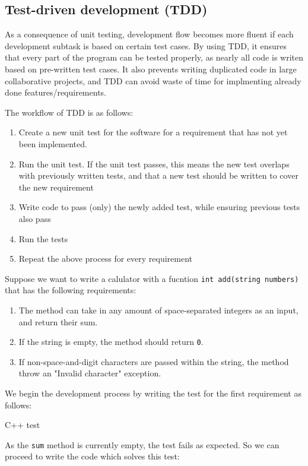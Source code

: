 \subsection{Test-driven development (TDD)}
As a consequence of unit testing, development flow becomes more fluent if each development subtask is based on certain test cases. By using TDD, it ensures that every part of the program can be tested properly, as nearly all code is writen based on pre-written test cases. It also prevents writing duplicated code in large collaborative projects, and TDD can avoid waste of time for implmenting already done features/requirements. 

The workflow of TDD is as follows:

\begin{enumerate}
	\item Create a new unit test for the software for a requirement that has not yet been implemented. 
	\item Run the unit test. If the unit test passes, this means the new test overlaps with previously written tests, and that a new test should be written to cover the new requirement
	\item Write code to pass (only) the newly added test, while ensuring previous tests also pass
	\item Run the tests
	\item Repeat the above process for every requirement
\end{enumerate}

Suppose we want to write a calulator with a fucntion \texttt{int add(string numbers)} that has the following requirements:

\begin{enumerate}
	\item The method can take in any amount of space-separated integers as an input, and return their sum.
	\item If the string is empty, the method should return \texttt{0}.
	\item If non-space-and-digit characters are passed within the string, the method throw an "Invalid character" exception. 
\end{enumerate}

We begin the development process by writing the test for the first requirement as follows:

\rem C++ test

As the \texttt{sum} method is currently empty, the test fails as expected. So we can proceed to write the code which solves this test:

